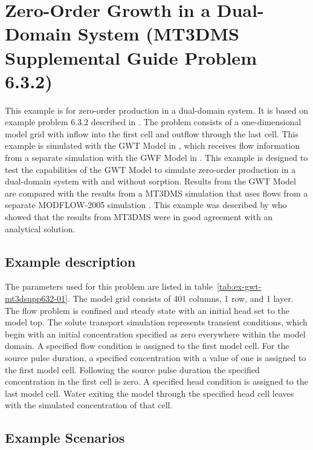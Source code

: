 \section{Zero-Order Growth in a Dual-Domain System (MT3DMS Supplemental Guide Problem 6.3.2)}

This example is for zero-order production in a dual-domain system.  It is based on example problem 6.3.2 described in \cite{zheng2010mt3dmsv5.3}.  The problem consists of a one-dimensional model grid with inflow into the first cell and outflow through the last cell.  This example is simulated with the GWT Model in \mf, which receives flow information from a separate simulation with the GWF Model in \mf.  This example is designed to test the capabilities of the GWT Model to simulate zero-order production in a dual-domain system with and without sorption.  Results from the GWT Model are compared with the results from a MT3DMS simulation \citep{zheng1990mt3d} that uses flows from a separate MODFLOW-2005 simulation \citep{modflow2005}.  This example was described by \cite{zheng2010mt3dmsv5.3} who showed that the results from MT3DMS were in good agreement with an analytical solution.

\subsection{Example description}

The parameters used for this problem are listed in table~\ref{tab:ex-gwt-mt3dsupp632-01}.  The model grid consists of 401 columns, 1 row, and 1 layer.  The flow problem is confined and steady state with an initial head set to the model top.  The solute transport simulation represents transient conditions, which begin with an initial concentration specified as zero everywhere within the model domain.  A specified flow condition is assigned to the first model cell.  For the source pulse duration, a specified concentration with a value of one is assigned to the first model cell.  Following the source pulse duration the specified concentration in the first cell is zero.  A specified head condition is assigned to the last model cell.  Water exiting the model through the specified head cell leaves with the simulated concentration of that cell.



\subsection{Example Scenarios}

